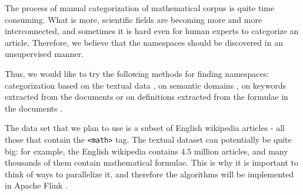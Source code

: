 The process of manual categorization of mathematical corpus is quite time consuming. What is more, scientific fields are becoming more and more interconnected, and sometimes it is hard even for human experts to categorize an article. Therefore, we believe that the namespaces should be discovered in an unsupervised manner.

Thus, we would like to try the following methods for finding namespaces: categorization based on the textual data \cite{sebastiani2002machine}, on semantic domains \cite{gliozzo2009semantic}, on keywords extracted from the documents \cite{schoneberg2014pos} or on definitions extracted from the formulae in the documents \cite{pagael2014mlp}.

The data set that we plan to use is a subset of English wikipedia articles - all those that contain the \texttt{<math>} tag. The textual dataset can potentially be quite big: for example, the English wikipedia contains 4.5 million articles, and many thousands of them contain mathematical formulae. This is why it is important to think of ways to parallelize it, and therefore the algorithms will be implemented in Apache Flink \cite{source:flink}.

